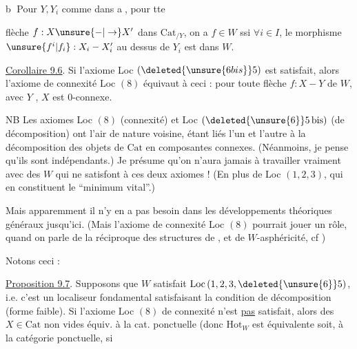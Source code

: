 \textcircled{b} Pour $Y,Y_i$ comme dans \textcircled{a}, pour tte

flèche $f:X\unsure{-|\to}X'$ dans $\mathrm{Cat}_{/Y}$, on a $f\in W$ ssi $\forall i\in I$,  le morphisme $\unsure{f^i|f_i}:X_i-X'_i$ au dessus de $Y_i$ est dans $W$.

\uline{Corollaire 9.6}. Si l'axiome Loc $(\deleted{\unsure{6 bis}}5)$ est satisfait, alors l'axiome de connexité Loc $(8)$ équivaut à ceci : pour toute flèche $f:X-Y$ de $W$, avec $Y$ , $X$ est $0$-connexe.

NB Les axiomes Loc $(8)$ (connexité) et Loc $(\deleted{\unsure{6}}5\,\mathrm{bis})$  (de décomposition) ont l'air de nature voisine,   étant liés l'un et l'autre  à la décomposition des objets de $\mathrm{Cat}$ en composantes connexes. (Néanmoins, je pense qu'ils sont indépendants.) Je présume qu'on n'aura jamais à travailler vraiment avec des $W$ qui ne satisfont à ces deux axiomes ! (En plus de Loc $(1,2,3)$, qui en constituent le ``minimum vital''.)

Mais apparemment il n'y en a pas besoin dans les développements théoriques généraux jusqu'ici. (Mais l'axiome de connexité Loc $(8)$ pourrait jouer un rôle, quand on parle de la  réciproque des structures de , et de $W$-asphéricité, cf )

Notons ceci :


\uline{Proposition 9.7}. Supposons  que $W$ satisfait $\mathrm{Loc}\,(1,2,3,\deleted{\unsure{6}}5)$, i.e. c'est un localiseur fondamental satisfaisant la condition de décomposition (forme faible).  Si l'axiome Loc $(8)$ de connexité n'est \uline{pas} satisfait, alors  des $X\in\mathrm{Cat}$ non vides  équiv. à la cat. ponctuelle (donc $\mathrm{Hot}_W$ est équivalente soit, à la catégorie ponctuelle,  si


